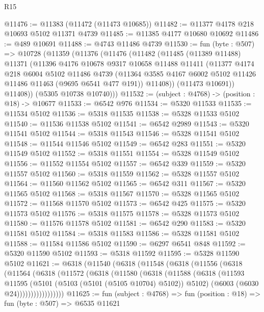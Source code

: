 \begin{lexlean}{R15}
\begin{coremodule}
{{{{{{{{{{{@11476 := @11383 (@11472 (@11473 @10685))
@11482 := @11377 @4178 @218 @10693 @5102 @11371 @4739
@11485 := @11385 @4177 @10680 @10692
@11486 := @489 @10691
@11488 := @4743 @11486 @4739
@11530 := fun (byte : @507) =>
  @10728
    (@11359
      (@11376
        (@11476
          (@11482
            (@11485
              (@11389 @11488)
              @11371
              (@11396
                @4176
                @10678
                @9317
                @10658
                @11488
                @11411
                (@11377
                  @4174
                  @218
                  @6004
                  @5102
                  @11486
                  @4739
                  (@11364 @3585 @4167 @6002 @5102 @11426 @11486 @11463 (@9695 @6541 @477 @191))
                  @11408))
              (@11473 @10691))
            @11408))
        (@5305 @10738 @10740)))
@11532 := (subject : @4768) -> (position : @18) -> @10677
@11533 := @6542 @976
@11534 := @5320 @11533
@11535 := @11534 @5102
@11536 := @5318 @11535
@11538 := @5328 @11533 @5102
@11540 := @11536 @11538 @5102
@11541 := @6542 @2989
@11543 := @5320 @11541 @5102
@11544 := @5318 @11543
@11546 := @5328 @11541 @5102
@11548 := @11544 @11546 @5102
@11549 := @6542 @283
@11551 := @5320 @11549 @5102
@11552 := @5318 @11551
@11554 := @5328 @11549 @5102
@11556 := @11552 @11554 @5102
@11557 := @6542 @339
@11559 := @5320 @11557 @5102
@11560 := @5318 @11559
@11562 := @5328 @11557 @5102
@11564 := @11560 @11562 @5102
@11565 := @6542 @311
@11567 := @5320 @11565 @5102
@11568 := @5318 @11567
@11570 := @5328 @11565 @5102
@11572 := @11568 @11570 @5102
@11573 := @6542 @425
@11575 := @5320 @11573 @5102
@11576 := @5318 @11575
@11578 := @5328 @11573 @5102
@11580 := @11576 @11578 @5102
@11581 := @6542 @290
@11583 := @5320 @11581 @5102
@11584 := @5318 @11583
@11586 := @5328 @11581 @5102
@11588 := @11584 @11586 @5102
@11590 := @6297 @6541 @848
@11592 := @5320 @11590 @5102
@11593 := @5318 @11592
@11595 := @5328 @11590 @5102
@11621 := @6318
    (@11540
      (@6318
        (@11548
          (@6318
            (@11556
              (@6318
                (@11564
                  (@6318
                    (@11572
                      (@6318
                        (@11580
                          (@6318
                            (@11588
                              (@6318
                                (@11593
                                  @11595
                                  (@5101 (@5103 (@5101 (@5105 @10704) @5102)) @5102)
                                  (@6003 (@6030 @24)))))))))))))))))
@11625 := fun (subject : @4768) => fun (position : @18) => fun (byte : @507) => @6535 @11621
}}}}}}}}}}}
\end{coremodule}
\end{lexlean}

